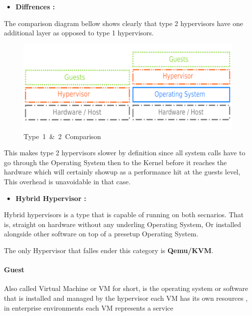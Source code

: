 \documentclass[
  14pt,
  english,
  a4paper,
]{scrreprt}
\providecommand{\tightlist}{%
  \setlength{\itemsep}{0pt}\setlength{\parskip}{0pt}}
\begin{document}
\begin{itemize}
\tightlist
\item
  \textbf{Diffrences :}
\end{itemize}

The comparison diagram bellow shows clearly that type 2 hypervisors have
one additional layer as opposed to type 1 hypervisors.

\begin{figure}
\hypertarget{fig:type1vs2}{%
\centering
\includegraphics[width=1.05\textwidth,height=\textheight]{figures/Type-1vs2-Hyp.png}
\caption{Type~1~\&~2~Comparison}\label{fig:type1vs2}
}
\end{figure}

This makes type 2 hypervisors slower by definition since all system
calls have to go through the Operating System then to the Kernel before
it reaches the hardware which will certainly showup as a performance hit
at the guests level, This overhead is unavoidable in that case.

\begin{itemize}
\tightlist
\item
  \textbf{Hybrid Hypervisor :}
\end{itemize}

Hybrid hypervisors is a type that is capable of running on both
secnarios. That is, straight on hardware without any underling Operating
System, Or installed alongside other software on top of a presetup
Operating System.

The only Hypervisor that falles ender this category is
\textbf{Qemu/KVM}.

\hypertarget{guest}{%
\paragraph{Guest}\label{guest}}

Also called Virtual Machine or VM for short, is the operating system or
software that is installed and managed by the hypervisor each VM has its
own resources , in enterprise environments each VM represents a service
\end{document}
